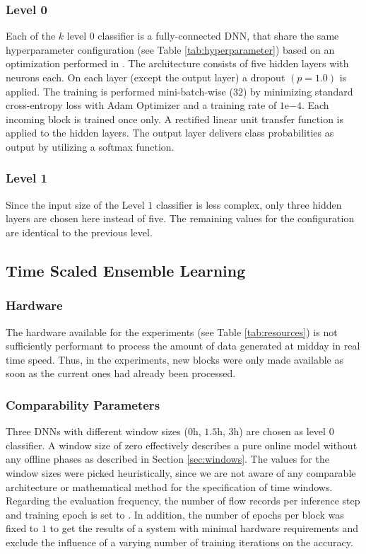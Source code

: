 \documentclass[conference]{IEEEtran}
\begin{document}
\subsubsection{Level 0}
Each of the $k$ level $0$ classifier is a fully-connected DNN, that share the same hyperparameter configuration (see Table \ref{tab:hyperparameter}) based on an optimization performed in \cite{pfulb_study_2019}. The architecture consists of five hidden layers with  neurons each. On each layer (except the output layer) a dropout $(p=1.0)$ is applied. The training is performed mini-batch-wise ($32$) by minimizing standard cross-entropy loss with Adam Optimizer and a training rate of $1\mathrm{e}{-4}$. Each incoming block is trained once only. A rectified linear unit transfer function is applied to the hidden layers. The output layer delivers class probabilities as output by utilizing a softmax function.

\subsubsection{Level 1}
Since the input size of the Level $1$ classifier is less complex, only three hidden layers are chosen here instead of five. The remaining values for the configuration are identical to the previous level.

\subsection{Time Scaled Ensemble Learning}
\subsubsection{Hardware}
The hardware available for the experiments (see Table \ref{tab:resources}) is not sufficiently performant to process the amount of data generated at midday in real time speed. Thus, in the experiments, new blocks were only made available as soon as the current ones had already been processed. 

\subsubsection{Comparability Parameters}
Three DNNs with different window sizes ($0$h, $1.5$h, $3$h) are chosen as level $0$ classifier. A window size of zero effectively describes a pure online model without any offline phases as described in Section \ref{sec:windows}. The values for the window sizes were picked heuristically, since we are not aware of any comparable architecture or mathematical method for the specification of time windows. Regarding the evaluation frequency, the number of flow records per inference step and training epoch is set to . In addition, the number of epochs per block was fixed to $1$ to get the results of a system with minimal hardware requirements and exclude the influence of a varying number of training iterations on the accuracy.
\end{document}
